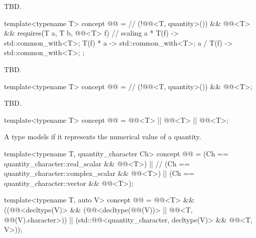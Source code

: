\pnum
TBD.

\begin{itemdecl}
template<typename T>
concept @@ =  // \expos
  (!@@<T, quantity>()) && @@<T> &&
  requires(T a, T b, @@<T> f) {
    // scaling
    { a * T(f) } -> std::common_with<T>;
    { T(f) * a } -> std::common_with<T>;
    { a / T(f) } -> std::common_with<T>;
  };
\end{itemdecl}

\pnum
TBD.

\begin{itemdecl}
template<typename T>
concept @@ =  // \expos
  (!@@<T, quantity>()) && @@<T>;
\end{itemdecl}

\pnum
TBD.

\begin{itemdecl}
template<typename T>
concept @@ = @@<T> || @@<T> ||
                         @@<T>;
\end{itemdecl}

\pnum
A type  models  if
it represents the numerical value of a quantity.

\begin{itemdecl}
template<typename T, quantity_character Ch>
concept @@ = (Ch == quantity_character::real_scalar && @@<T>) ||  // \expos
                        (Ch == quantity_character::complex_scalar && @@<T>) ||
                        (Ch == quantity_character::vector && @@<T>);

template<typename T, auto V>
concept @@ =
  @@<T> && ((@@<decltype(V)> &&
                         (@@<decltype(@@(V))> ||
                          @@<T, @@(V).character>)) ||
                        (std::@@<quantity_character, decltype(V)> && @@<T, V>));
\end{itemdecl}

